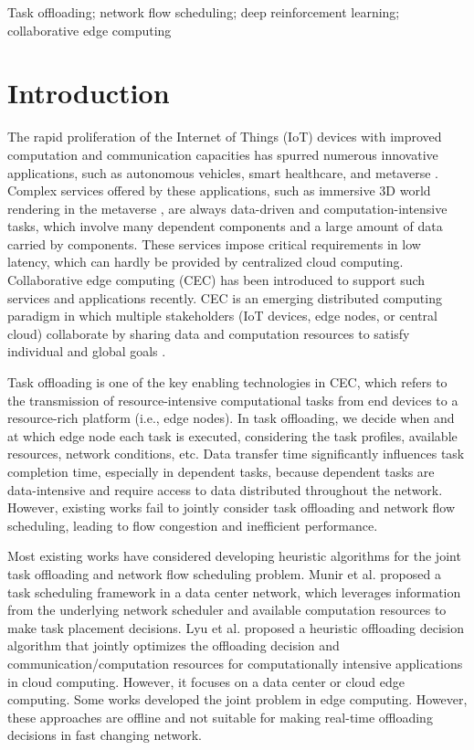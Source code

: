 \documentclass[10pt, conference, letterpaper]{IEEEtran}
\begin{document}
\begin{IEEEkeywords}
Task offloading; network flow scheduling; deep reinforcement learning; collaborative edge computing
\end{IEEEkeywords}

\section{Introduction}
The rapid proliferation of the Internet of Things (IoT) devices with improved computation and communication capacities has spurred numerous innovative applications, such as autonomous vehicles, smart healthcare, and metaverse \cite{khan2020edge, xu2022full}. Complex services offered by these applications, such as immersive 3D world rendering in the metaverse \cite{xu2022full}, are always data-driven and computation-intensive tasks, which involve many dependent components and a large amount of data carried by components. These services impose critical requirements in low latency, which can hardly be provided by centralized cloud computing. Collaborative edge computing (CEC) has been introduced to support such services and applications recently. CEC is an emerging distributed computing paradigm in which multiple stakeholders (IoT devices, edge nodes, or central cloud) collaborate by sharing data and computation resources to satisfy individual and global goals \cite{sahni2020multi}.

Task offloading is one of the key enabling technologies in CEC, which refers to the transmission of resource-intensive computational tasks from end devices to a resource-rich platform (i.e., edge nodes). In task offloading, we decide when and at which edge node each task is executed, considering the task profiles, available resources, network conditions, etc. Data transfer time significantly influences task completion time, especially in dependent tasks, because dependent tasks are data-intensive and require access to data distributed throughout the network. However, existing works fail to jointly consider task offloading and network flow scheduling, leading to flow congestion and inefficient performance.

Most existing works have considered developing heuristic algorithms for the joint task offloading and network flow scheduling problem. Munir et al. \cite{ munir2020network} proposed a task scheduling framework in a data center network, which leverages information from the underlying network scheduler and available computation resources to make task placement decisions. Lyu et al. \cite{lyu2016multiuser} proposed a heuristic offloading decision algorithm that jointly optimizes the offloading decision and communication/computation resources for computationally intensive applications in cloud computing. However, it focuses on a data center or cloud edge computing. Some works \cite{tran2018joint, sahni2020multihop, sahni2020multi} developed the joint problem in edge computing. However, these approaches are offline and not suitable for making real-time offloading decisions in fast changing network. 
\end{document}
